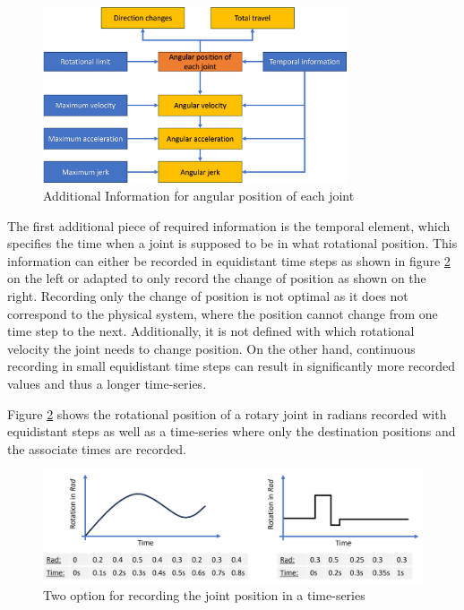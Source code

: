 \begin{figure}[H]
	\centerline{\includegraphics[width=0.8\textwidth]{figures/angularstuff.png}}
	\caption{Additional Information for angular position of each joint}
	\label{agularstuff}
\end{figure}



The first additional piece of required information is the temporal element, which specifies the time when a joint is supposed to be in what rotational position. This information can either be recorded in equidistant time steps as shown in figure \ref{equi} on the left or adapted to only record the change of position as shown on the right. Recording only the change of position is not optimal as it does not correspond to the physical system, where the position cannot change from one time step to the next. Additionally, it is not defined with which rotational velocity the joint needs to change position. On the other hand, continuous recording in small equidistant time steps can result in significantly more recorded values and thus a longer time-series.

Figure \ref{equi} shows the rotational position of a rotary joint in radians recorded with equidistant steps as well as a time-series where only the destination positions and the associate times are recorded.


\begin{figure}[H]
	\centerline{\includegraphics[width=1\textwidth]{figures/equionchange.png}}
	\caption{Two option for recording the joint position in a time-series}
	\label{equi}
\end{figure}

